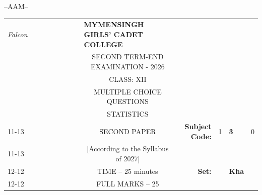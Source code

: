 \documentclass[12pt]{exam}
\begin{document}
\vspace{1cm}
\begin{center}
\vfill
--AAM--
\end{center}

\newpage


\begin{table}[]
\begin{tabular}{llllllllcllll}
\textit{Falcon} &  &  &  &  &  &  &  & \multicolumn{1}{l}{\textbf{MYMENSINGH GIRLS' CADET COLLEGE}} &                                             &                        &                                 &                        \\
                &  &  &  &  &  &  &  & \multicolumn{1}{c}{SECOND TERM-END EXAMINATION - 2026}       &                                             &                        & \multicolumn{1}{c}{}            &                        \\
                &  &  &  &  &  &  &  & CLASS: XII                                                   &                                             &                        & \multicolumn{1}{c}{}            &                        \\
                &  &  &  &  &  &  &  & MULTIPLE CHOICE QUESTIONS                                    &                                             &                        & \multicolumn{1}{c}{}            &                        \\
                &  &  &  &  &  &  &  & STATISTICS                                                   &                                             &                        & \multicolumn{1}{r}{}            &                        \\ \cline{11-13} 
                &  &  &  &  &  &  &  & SECOND PAPER                                                 & \multicolumn{1}{r|}{\textbf{Subject Code:}} & \multicolumn{1}{l|}{1} & \multicolumn{1}{l|}{\textbf{3}} & \multicolumn{1}{l|}{0} \\ \cline{11-13} 
                &  &  &  &  &  &  &  & [According to the Syllabus of 2027]                          & \multicolumn{1}{r}{}                        &                        &                                 &                        \\ \cline{12-12}
                &  &  &  &  &  &  &  & TIME – 25 minutes                                            & \multicolumn{1}{r}{\textbf{Set:}}           & \multicolumn{1}{l|}{}  & \multicolumn{1}{l|}{\textbf{Kha}} &                        \\ \cline{12-12}
                &  &  &  &  &  &  &  & FULL MARKS – 25                                              &                                             &                        &                                 &                       
\end{tabular}
\end{table}
\end{document}
